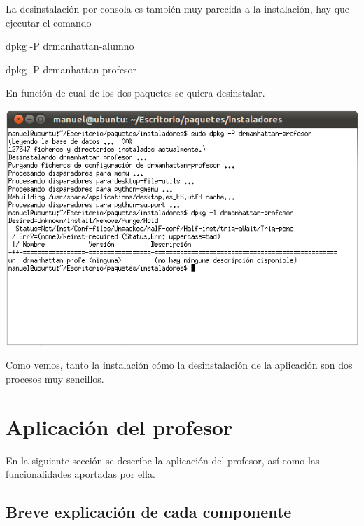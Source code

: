 \documentclass[11pt]{article}
\begin{document}
La desinstalación por consola es también muy parecida a la instalación, hay que ejecutar el comando

\begin{center}
    dpkg -P drmanhattan-alumno

    dpkg -P drmanhattan-profesor
\end{center}

En función de cual de los dos paquetes se quiera desinstalar.

\begin{center}

    \includegraphics[width=.90\linewidth]{imagenes/desConsola}

\end{center}

Como vemos, tanto la instalación cómo la desinstalación de la aplicación son dos procesos muy sencillos.


\newpage
\section{Aplicación del profesor}

En la siguiente sección se describe la aplicación del profesor, así como las funcionalidades aportadas por ella.

\subsection{Breve explicación de cada componente}
\end{document}

